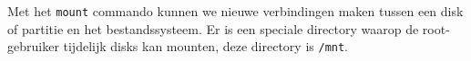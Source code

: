 Met het \texttt{mount} commando kunnen we nieuwe verbindingen maken tussen een disk of partitie en het bestandssysteem. Er is een speciale directory waarop de root-gebruiker tijdelijk disks kan mounten, deze directory is \texttt{/mnt}.

